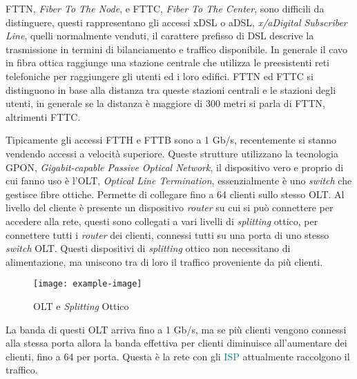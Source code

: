 \documentclass{article}
\numberwithin{equation}{subsection}
\begin{document}
FTTN, \textit{Fiber To The Node}, e FTTC, \textit{Fiber To The Center}, sono difficili da distinguere, questi rappresentano gli accessi xDSL o aDSL, \textit{x/aDigital Subscriber Line}, quelli normalmente venduti, il carattere prefisso di DSL descrive la trasmissione 
in termini di bilanciamento e traffico disponibile. In generale il cavo in fibra ottica raggiunge una stazione centrale che utilizza le preesistenti reti telefoniche per raggiungere gli utenti ed i loro edifici. FTTN ed FTTC si distinguono in base alla distanza tra queste stazioni centrali e le stazioni degli utenti, in generale se la distanza è maggiore di 300 metri si parla di FTTN, altrimenti FTTC. 

Tipicamente gli accessi FTTH e FTTB sono a 1 Gb/s, recentemente si stanno vendendo accessi a velocità superiore. 
Queste strutture utilizzano la tecnologia GPON, \textit{Gigabit-capable Passive Optical Network}, il dispositivo vero e proprio di cui fanno uso è l'OLT, \textit{Optical Line Termination}, 
essenzialmente è uno \textit{switch} che gestisce fibre ottiche. Permette di collegare fino a 64 clienti sullo stesso OLT. 
Al livello del cliente è presente un dispositivo \textit{\textit{router}} su cui si può connettere per accedere alla rete, questi sono collegati a vari livelli di \textit{splitting} ottico, per connettere 
tutti i \textit{\textit{router}} dei clienti, connessi tutti su una porta di uno stesso \textit{switch} OLT. Questi dispositivi di \textit{splitting} ottico non necessitano di alimentazione, ma uniscono tra di loro 
il traffico proveniente da più clienti. 

\begin{figure}[H]%
    \centering%
    \texttt{[image: example-image]}%
    \caption{OLT e \textit{Splitting} Ottico}%
\end{figure}

La banda di questi OLT arriva fino a 1 Gb/s, ma se più clienti vengono connessi alla stessa porta allora la banda effettiva per clienti diminuisce all'aumentare dei 
clienti, fino a 64 per porta. Questa è la rete con gli \textcolor{teal}{ISP} attualmente raccolgono il traffico. 
\end{document}
